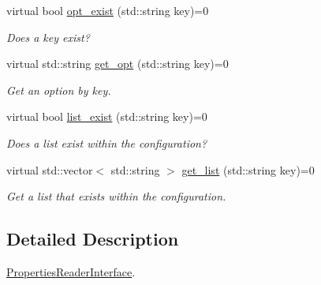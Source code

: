 \begin{DoxyCompactItemize}
\item 
virtual bool \hyperlink{classPropertiesReaderInterface_a092db49483a5f97b1eb6e2fdca5b97fb}{opt\+\_\+exist} (std\+::string key)=0\hypertarget{classPropertiesReaderInterface_a092db49483a5f97b1eb6e2fdca5b97fb}{}\label{classPropertiesReaderInterface_a092db49483a5f97b1eb6e2fdca5b97fb}

\begin{DoxyCompactList}\small\item\em Does a key exist? \end{DoxyCompactList}\item 
virtual std\+::string \hyperlink{classPropertiesReaderInterface_a16db6a1917d0274811a499b2a270679b}{get\+\_\+opt} (std\+::string key)=0\hypertarget{classPropertiesReaderInterface_a16db6a1917d0274811a499b2a270679b}{}\label{classPropertiesReaderInterface_a16db6a1917d0274811a499b2a270679b}

\begin{DoxyCompactList}\small\item\em Get an option by key. \end{DoxyCompactList}\item 
virtual bool \hyperlink{classPropertiesReaderInterface_ab088ce690f3f96b3f885d762289c23c2}{list\+\_\+exist} (std\+::string key)=0\hypertarget{classPropertiesReaderInterface_ab088ce690f3f96b3f885d762289c23c2}{}\label{classPropertiesReaderInterface_ab088ce690f3f96b3f885d762289c23c2}

\begin{DoxyCompactList}\small\item\em Does a list exist within the configuration? \end{DoxyCompactList}\item 
virtual std\+::vector$<$ std\+::string $>$ \hyperlink{classPropertiesReaderInterface_a466f88254dc3f26691e73ba739bdabce}{get\+\_\+list} (std\+::string key)=0\hypertarget{classPropertiesReaderInterface_a466f88254dc3f26691e73ba739bdabce}{}\label{classPropertiesReaderInterface_a466f88254dc3f26691e73ba739bdabce}

\begin{DoxyCompactList}\small\item\em Get a list that exists within the configuration. \end{DoxyCompactList}\end{DoxyCompactItemize}


\subsection{Detailed Description}
\hyperlink{classPropertiesReaderInterface}{Properties\+Reader\+Interface}. 


